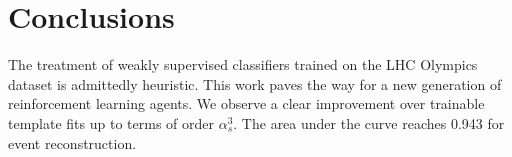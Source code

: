 \section{Conclusions}\label{sec:conclusions}

The treatment of weakly supervised classifiers trained on the LHC
Olympics dataset is admittedly heuristic. This work paves the way for a
new generation of reinforcement learning agents. We observe a clear
improvement over trainable template fits up to terms of order
$\alpha_s^3$. The area under the curve reaches 0.943 for event
reconstruction.


